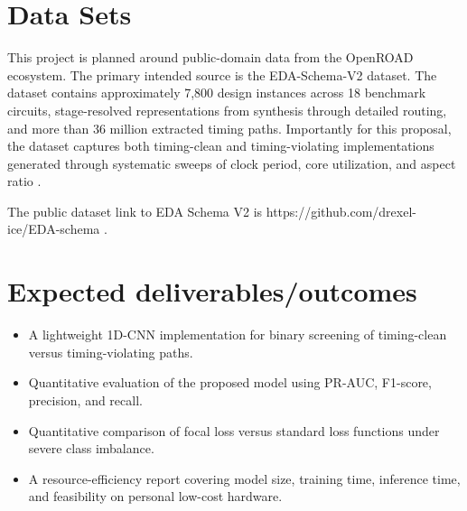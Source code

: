 \documentclass[12pt,a4paper]{article}
\begin{document}
\section{Data Sets}


This project is planned around public-domain data from the OpenROAD ecosystem. The primary intended source is the EDA-Schema-V2 dataset. The dataset contains approximately 7,800 design instances across 18 benchmark circuits, stage-resolved representations from synthesis through detailed routing, and more than 36 million extracted timing paths. Importantly for this proposal, the dataset captures both timing-clean and timing-violating implementations generated through systematic sweeps of clock period, core utilization, and aspect ratio \cite{Shrestha2026EDA-Schema-V2:}.

The public dataset link to EDA Schema V2 is https://github.com/drexel-ice/EDA-schema .

\section{Expected deliverables/outcomes}


\begin{itemize}
\item A lightweight 1D-CNN implementation for binary screening of timing-clean versus timing-violating paths.
\item Quantitative evaluation of the proposed model using PR-AUC, F1-score, precision, and recall.
\item Quantitative comparison of focal loss versus standard loss functions under severe class imbalance.
\item A resource-efficiency report covering model size, training time, inference time, and feasibility on personal low-cost hardware.
\end{itemize}
\end{document}
